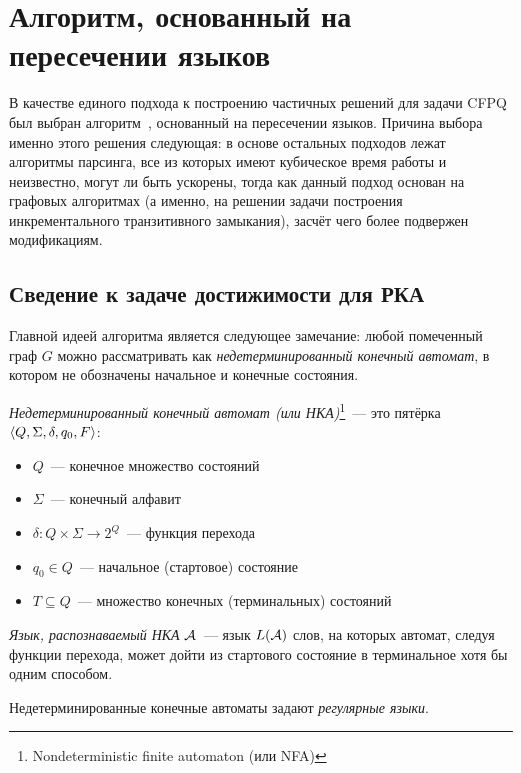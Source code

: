 \section{Алгоритм, основанный на пересечении языков}\label{section:algo_idea}

В качестве единого подхода к построению частичных решений для задачи CFPQ был выбран алгоритм~\cite{Chaudhuri08, Orachev20}, основанный на пересечении языков. Причина выбора именно этого решения следующая: в основе остальных подходов лежат алгоритмы парсинга, все из которых имеют кубическое время работы и неизвестно, могут ли быть ускорены, тогда как данный подход основан на графовых алгоритмах (а именно, на решении задачи построения инкрементального транзитивного замыкания), засчёт чего более подвержен модификациям.


\subsection{Сведение к задаче достижимости для РКА}

Главной идеей алгоритма является следующее замечание: любой помеченный граф $G$ можно рассматривать как \textit{недетерминированный конечный автомат}, в котором не обозначены начальное и конечные состояния.

\begin{definition}

  \textit{Недетерминированный конечный автомат (или НКА)}\footnote{Nondeterministic finite automaton (или NFA)}~--- это пятёрка $\langle Q, \Sigma, \delta, q_0, F \rangle$:
  \vspace{-\topsep}
  \begin{itemize}
    \setlength\itemsep{-0.1em}
    \item $Q$~--- конечное множество состояний
    \item $\Sigma$~--- конечный алфавит
    \item $\delta \colon Q \times \Sigma \to 2^Q$~--- функция перехода
    \item $q_0 \in Q$~--- начальное (стартовое) состояние
    \item $T \subseteq Q$~--- множество конечных (терминальных) состояний
  \end{itemize}

  \textit{Язык, распознаваемый НКА} $\mathcal{A}$~--- язык $L(\mathcal{A})$ слов, на которых автомат, следуя функции перехода, может дойти из стартового состояние в терминальное хотя бы одним способом.

  Недетерминированные конечные автоматы задают \textit{регулярные языки}.
\end{definition}

